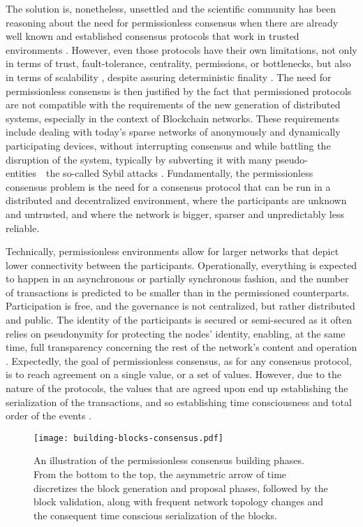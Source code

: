 The solution is, nonetheless, unsettled and the scientific community has been reasoning about the need for permissionless consensus when there are already well known and established consensus protocols that work in trusted environments \cite{castro1999practical, miller2016honey}. However, even those protocols have their own limitations, not only in terms of trust, fault-tolerance, centrality, permissions, or bottlenecks, but also in terms of scalability \cite{miller2016honey}, despite assuring deterministic finality \cite{decker2016bitcoin}. The need for permissionless consensus is then justified by the fact that permissioned protocols are not compatible with the requirements of the new generation of distributed systems, especially in the context of Blockchain networks. These requirements include dealing with today's sparse networks of anonymously and dynamically participating devices, without interrupting consensus and while battling the disruption of the system, typically by subverting it with many pseudo-entities~\textemdash~the so-called Sybil attacks \cite{8629877, survey-dist-consensus}. Fundamentally, the permissionless consensus problem is the need for a consensus protocol that can be run in a distributed and decentralized environment, where the participants are unknown and untrusted, and where the network is bigger, sparser and unpredictably less reliable.

Technically, permissionless environments allow for larger networks that depict lower connectivity between the participants. Operationally, everything is expected to happen in an asynchronous or partially synchronous fashion, and the number of transactions is predicted to be smaller than in the permissioned counterparts. Participation is free, and the governance is not centralized, but rather distributed and public. The identity of the participants is secured or semi-secured as it often relies on pseudonymity for protecting the nodes' identity, enabling, at the same time, full transparency concerning the rest of the network's content and operation \cite{xiao2019distributed}. Expectedly, the goal of permissionless consensus, as for any consensus protocol, is to reach agreement on a single value, or a set of values. However, due to the nature of the protocols, the values that are agreed upon end up establishing the serialization of the transactions, and so establishing time consciousness and total order of the events \cite{8629877}.

\begin{figure}[ht]
  \begin{center}
  \texttt{[image: building-blocks-consensus.pdf]}
  \caption{An illustration of the permissionless consensus building phases. From the bottom to the top, the asymmetric arrow of time discretizes the block generation and proposal phases, followed by the block validation, along with frequent network topology changes and the consequent time conscious serialization of the blocks.}
  \label{fig:building-blocks-consensus}
  \end{center}
\end{figure}

